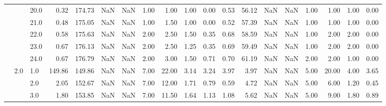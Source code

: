 \begin{tabular}{lllrrrrrrrrrrrrrrrr}
       &     & 20.0 &      0.32 &     174.73 &               NaN &                NaN &  1.00 &   1.00 &             1.00 &                         0.00 &      0.53 &      56.12 &               NaN &                NaN &  1.00 &   1.00 &             1.00 &                         0.00 \\
       &     & 21.0 &      0.48 &     175.05 &               NaN &                NaN &  1.00 &   1.50 &             1.00 &                         0.00 &      0.52 &      57.39 &               NaN &                NaN &  1.00 &   1.00 &             1.00 &                         0.00 \\
       &     & 22.0 &      0.58 &     175.63 &               NaN &                NaN &  2.00 &   2.50 &             1.50 &                         0.35 &      0.68 &      58.59 &               NaN &                NaN &  1.00 &   2.00 &             2.00 &                         0.00 \\
       &     & 23.0 &      0.67 &     176.13 &               NaN &                NaN &  2.00 &   2.50 &             1.25 &                         0.35 &      0.69 &      59.49 &               NaN &                NaN &  1.00 &   2.00 &             2.00 &                         0.00 \\
       &     & 24.0 &      0.67 &     176.79 &               NaN &                NaN &  2.00 &   3.00 &             1.50 &                         0.71 &      0.70 &      61.19 &               NaN &                NaN &  2.00 &   2.00 &             1.00 &                         0.00 \\
       & 2.0 & 1.0  &    149.86 &     149.86 &               NaN &                NaN &  7.00 &  22.00 &             3.14 &                         3.24 &      3.97 &       3.97 &               NaN &                NaN &  5.00 &  20.00 &             4.00 &                         3.65 \\
       &     & 2.0  &      2.05 &     152.67 &               NaN &                NaN &  7.00 &  12.00 &             1.71 &                         0.79 &      0.59 &       4.72 &               NaN &                NaN &  5.00 &   6.00 &             1.20 &                         0.45 \\
       &     & 3.0  &      1.80 &     153.85 &               NaN &                NaN &  7.00 &  11.50 &             1.64 &                         1.13 &      1.08 &       5.62 &               NaN &                NaN &  5.00 &   9.00 &             1.80 &                         0.89 \\

\end{tabular}
